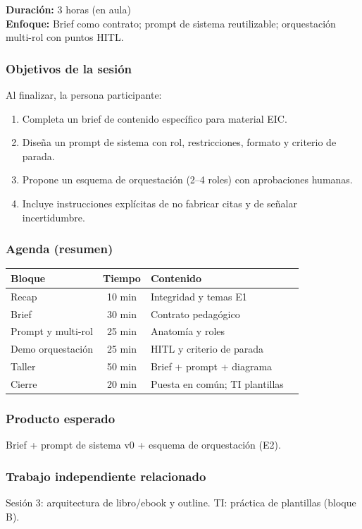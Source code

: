 \textbf{Duración:} 3 horas (en aula)\\
\textbf{Enfoque:} Brief como contrato; prompt de sistema reutilizable; orquestación multi-rol con puntos HITL.

\subsubsection*{Objetivos de la sesión}
Al finalizar, la persona participante:
\begin{enumerate}
\item Completa un brief de contenido específico para material EIC.
\item Diseña un prompt de sistema con rol, restricciones, formato y criterio de parada.
\item Propone un esquema de orquestación (2--4 roles) con aprobaciones humanas.
\item Incluye instrucciones explícitas de no fabricar citas y de señalar incertidumbre.
\end{enumerate}

\subsubsection*{Agenda (resumen)}
\begin{tabularx}{\textwidth}{@{}lclX@{}}
\toprule
Bloque & Tiempo & Contenido \\
\midrule
Recap & 10 min & Integridad y temas E1 \\
Brief & 30 min & Contrato pedagógico \\
Prompt y multi-rol & 25 min & Anatomía y roles \\
Demo orquestación & 25 min & HITL y criterio de parada \\
Taller & 50 min & Brief + prompt + diagrama \\
Cierre & 20 min & Puesta en común; TI plantillas \\
\bottomrule
\end{tabularx}

\subsubsection*{Producto esperado}
Brief + prompt de sistema v0 + esquema de orquestación (E2).

\subsubsection*{Trabajo independiente relacionado}
Sesión 3: arquitectura de libro/ebook y outline. TI: práctica de plantillas (bloque B).
